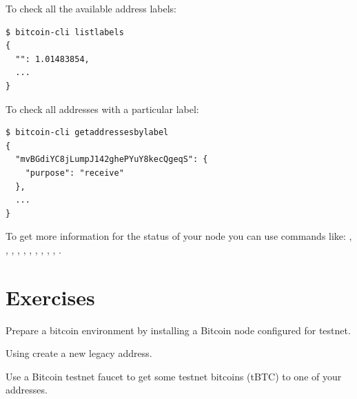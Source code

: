 \noindent To check all the available address labels:
\begin{emphbox}
\begin{lstlisting}[style=Bash]
$ bitcoin-cli listlabels
{
  "": 1.01483854,
  ...
}
\end{lstlisting}
\end{emphbox}
\vspace{1em}

\noindent To check all addresses with a particular label:
\begin{emphbox}
\begin{lstlisting}[style=Bash]
$ bitcoin-cli getaddressesbylabel
{ 
  "mvBGdiYC8jLumpJ142ghePYuY8kecQgeqS": {
    "purpose": "receive"
  },
  ...
}
\end{lstlisting}
\end{emphbox}
\vspace{1em}




To get more information for the status of your node you can use commands like: , , , , , , , , , , .

\section{Exercises}

\begin{exercise}
Prepare a bitcoin environment by installing a Bitcoin node configured for testnet. 
\end{exercise}

\begin{exercise}
Using  create a new legacy address.
\end{exercise}

\begin{exercise}
Use a Bitcoin testnet faucet to get some testnet bitcoins (tBTC) to one of your addresses.
\end{exercise}

